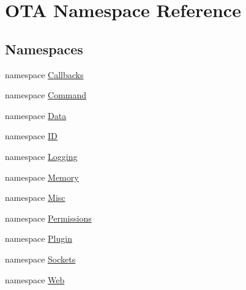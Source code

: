 \hypertarget{namespace_o_t_a}{}\section{O\+T\+A Namespace Reference}
\label{namespace_o_t_a}
\subsection*{Namespaces}
\begin{DoxyCompactItemize}
\item 
namespace \hyperlink{namespace_o_t_a_1_1_callbacks}{Callbacks}
\item 
namespace \hyperlink{namespace_o_t_a_1_1_command}{Command}
\item 
namespace \hyperlink{namespace_o_t_a_1_1_data}{Data}
\item 
namespace \hyperlink{namespace_o_t_a_1_1_i_d}{I\+D}
\item 
namespace \hyperlink{namespace_o_t_a_1_1_logging}{Logging}
\item 
namespace \hyperlink{namespace_o_t_a_1_1_memory}{Memory}
\item 
namespace \hyperlink{namespace_o_t_a_1_1_misc}{Misc}
\item 
namespace \hyperlink{namespace_o_t_a_1_1_permissions}{Permissions}
\item 
namespace \hyperlink{namespace_o_t_a_1_1_plugin}{Plugin}
\item 
namespace \hyperlink{namespace_o_t_a_1_1_sockets}{Sockets}
\item 
namespace \hyperlink{namespace_o_t_a_1_1_web}{Web}
\end{DoxyCompactItemize}
